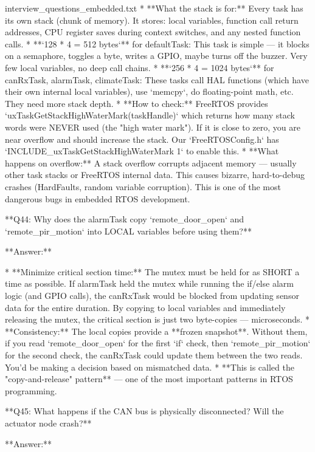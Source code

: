 \begin{filecontents*}{interview_questions_embedded.txt}
* **What the stack is for:** Every task has its own stack (chunk of memory). It stores: local variables, function call return addresses, CPU register saves during context switches, and any nested function calls.
* **`128 * 4 = 512 bytes`** for defaultTask: This task is simple — it blocks on a semaphore, toggles a byte, writes a GPIO, maybe turns off the buzzer. Very few local variables, no deep call chains.
* **`256 * 4 = 1024 bytes`** for canRxTask, alarmTask, climateTask: These tasks call HAL functions (which have their own internal local variables), use `memcpy`, do floating-point math, etc. They need more stack depth.
* **How to check:** FreeRTOS provides `uxTaskGetStackHighWaterMark(taskHandle)` which returns how many stack words were NEVER used (the "high water mark"). If it is close to zero, you are near overflow and should increase the stack. Our `FreeRTOSConfig.h` has `INCLUDE_uxTaskGetStackHighWaterMark 1` to enable this.
* **What happens on overflow:** A stack overflow corrupts adjacent memory — usually other task stacks or FreeRTOS internal data. This causes bizarre, hard-to-debug crashes (HardFaults, random variable corruption). This is one of the most dangerous bugs in embedded RTOS development.

**Q44: Why does the alarmTask copy `remote_door_open` and `remote_pir_motion` into LOCAL variables before using them?**

**Answer:**

* **Minimize critical section time:** The mutex must be held for as SHORT a time as possible. If alarmTask held the mutex while running the if/else alarm logic (and GPIO calls), the canRxTask would be blocked from updating sensor data for the entire duration. By copying to local variables and immediately releasing the mutex, the critical section is just two byte-copies — microseconds.
* **Consistency:** The local copies provide a **frozen snapshot**. Without them, if you read `remote_door_open` for the first `if` check, then `remote_pir_motion` for the second check, the canRxTask could update them between the two reads. You'd be making a decision based on mismatched data.
* **This is called the "copy-and-release" pattern** — one of the most important patterns in RTOS programming.

**Q45: What happens if the CAN bus is physically disconnected? Will the actuator node crash?**

**Answer:**


\end{filecontents*}
